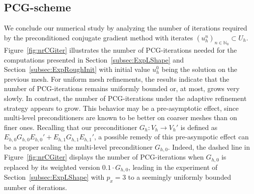 \documentclass{amsart}
\begin{document}
\subsection{PCG-scheme}\label{subsec:ExpPreCond}
We conclude our numerical study by analyzing the number of iterations required by the preconditioned conjugate gradient method with iterates $(u_h^n)_{n\in \mathbb{N}_0} \subset U_h$. 
Figure~\ref{fig:nrCGiter} illustrates the number of PCG-iterations needed for the computations presented in Section~\ref{subsec:ExpLShape} and Section~\ref{subsec:ExpRoughInit} with initial value $u_h^0$ being the solution on the previous mesh. For uniform mesh refinements, the results indicate that the number of PCG-iterations remains uniformly bounded or, at most, grows very slowly. In contrast, the number of PCG-iterations under the adaptive refinement strategy appears to grow. This behavior may be a pre-asymptotic effect, since multi-level preconditioners are known to be better on coarser meshes than on finer ones. Recalling that our preconditioner $G_h\colon V_h \rightarrow V_h'$  is defined as $E_{h,0} G_{h,0} E_{h,0}'+E_{h,1} G_{h,1} E_{h,1}'$, a possible remedy of this pre-asympotic effect can be a proper scaling the multi-level preconditioner $G_{h,0}$. Indeed, the dashed line in Figure~\ref{fig:nrCGiter} displays the number of PCG-iterations when $G_{h,0}$ is replaced by its weighted version $0.1\cdot G_{h,0}$, leading in the experiment of Section~\ref{subsec:ExpLShape} with $p_x=3$ to a seemingly uniformly bounded number of iterations.
\end{document}
